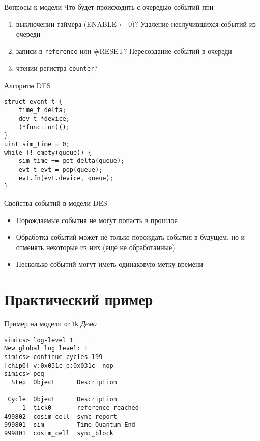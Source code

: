 \documentclass{beamer}
\begin{document}
\begin{frame}{Вопросы к модели}
Что будет происходить с очередью событий при
\begin{enumerate}
    \item выключении таймера (ENABLE ← 0)?\pause{} Удаление неслучившихся событий из очереди
    \item записи в \texttt{reference} или \#RESET?\pause{} Пересоздание событий в очереди
    \item чтении регистра \texttt{counter}?
\end{enumerate}
\end{frame}

\begin{frame}[fragile]{Алгоритм DES}

\begin{verbatim}
struct event_t {
    time_t delta;
    dev_t *device;
    (*function)();
}
uint sim_time = 0;
while (! empty(queue)) {
    sim_time += get_delta(queue);
    evt_t evt = pop(queue);
    evt.fn(evt.device, queue);
}
\end{verbatim}

\end{frame}

\begin{frame}{Свойства событий в модели DES}

\begin{itemize}
\item Порождаемые события не могут попасть в прошлое
\item Обработка событий может не только порождать события в будущем, но и отменять некоторые из них (ещё не обработанные)
\item Несколько событий могут иметь одинаковую метку времени
\end{itemize}

\end{frame}

\section{Практический пример}

\begin{frame}[fragile]{Пример на модели \texttt{or1k}}
\emph{Демо}

\begin{verbatim}
simics> log-level 1
New global log level: 1
simics> continue-cycles 199
[chip0] v:0x031c p:0x031c  nop
simics> peq
  Step  Object      Description

 Cycle  Object      Description
     1  tick0       reference_reached
499802  cosim_cell  sync_report
999801  sim         Time Quantum End
999801  cosim_cell  sync_block
\end{verbatim}    
\end{frame}
\end{document}
